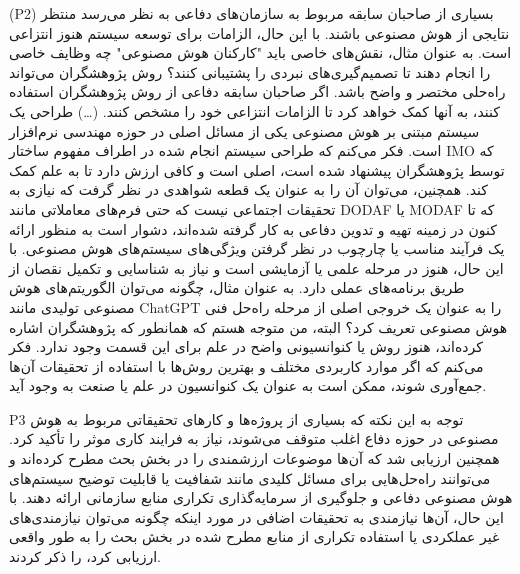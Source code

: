 \documentclass[a4paper,10pt]{article}
\begin{document}
                    \begin{addinfo}
                        
                        (P2) بسیاری از صاحبان سابقه مربوط به سازمان‌های دفاعی به نظر می‌رسد منتظر نتایجی از هوش مصنوعی باشند. با این حال، الزامات برای توسعه سیستم هنوز انتزاعی است. به عنوان مثال، نقش‌های خاصی باید "کارکنان هوش مصنوعی" چه وظایف خاصی را انجام دهند تا تصمیم‌گیری‌های نبردی را پشتیبانی کنند؟ روش پژوهشگران می‌تواند راه‌حلی مختصر و واضح باشد. اگر صاحبان سابقه دفاعی از روش پژوهشگران استفاده کنند، به آنها کمک خواهد کرد تا الزامات انتزاعی خود را مشخص کنند. (…) طراحی یک سیستم مبتنی بر هوش مصنوعی یکی از مسائل اصلی در حوزه مهندسی نرم‌افزار است. فکر می‌کنم که طراحی سیستم انجام شده در اطراف مفهوم ساختار IMO که توسط پژوهشگران پیشنهاد شده است، اصلی است و کافی ارزش دارد تا به علم کمک کند. همچنین، می‌توان آن را به عنوان یک قطعه شواهدی در نظر گرفت که نیازی به تحقیقات اجتماعی نیست که حتی فرم‌های معاملاتی مانند DODAF یا MODAF که تا کنون در زمینه تهیه و تدوین دفاعی به کار گرفته شده‌اند، دشوار است به منظور ارائه یک فرآیند مناسب یا چارچوب در نظر گرفتن ویژگی‌های سیستم‌های هوش مصنوعی. با این حال، هنوز در مرحله علمی یا آزمایشی است و نیاز به شناسایی و تکمیل نقصان از طریق برنامه‌های عملی دارد. به عنوان مثال، چگونه می‌توان الگوریتم‌های هوش مصنوعی تولیدی مانند ChatGPT را به عنوان یک خروجی اصلی از مرحله راه‌حل فنی هوش مصنوعی تعریف کرد؟ البته، من متوجه هستم که همانطور که پژوهشگران اشاره کرده‌اند، هنوز روش یا کنوانسیونی واضح در علم برای این قسمت وجود ندارد. فکر می‌کنم که اگر موارد کاربردی مختلف و بهترین روش‌ها با استفاده از تحقیقات آن‌ها جمع‌آوری شوند، ممکن است به عنوان یک کنوانسیون در علم یا صنعت به وجود آید.

                    \end{addinfo}

                    P3 توجه به این نکته که بسیاری از پروژه‌ها و کارهای تحقیقاتی مربوط به هوش مصنوعی در حوزه دفاع اغلب متوقف می‌شوند، نیاز به فرایند کاری موثر را تأکید کرد. همچنین ارزیابی شد که آن‌ها موضوعات ارزشمندی را در بخش بحث مطرح کرده‌اند و می‌توانند راه‌حل‌هایی برای مسائل کلیدی مانند شفافیت یا قابلیت توضیح سیستم‌های هوش مصنوعی دفاعی و جلوگیری از سرمایه‌گذاری تکراری منابع سازمانی ارائه دهند. با این حال، آن‌ها نیازمندی به تحقیقات اضافی در مورد اینکه چگونه می‌توان نیازمندی‌های غیر عملکردی یا استفاده تکراری از منابع مطرح شده در بخش بحث را به طور واقعی ارزیابی کرد، را ذکر کردند.
\end{document}
